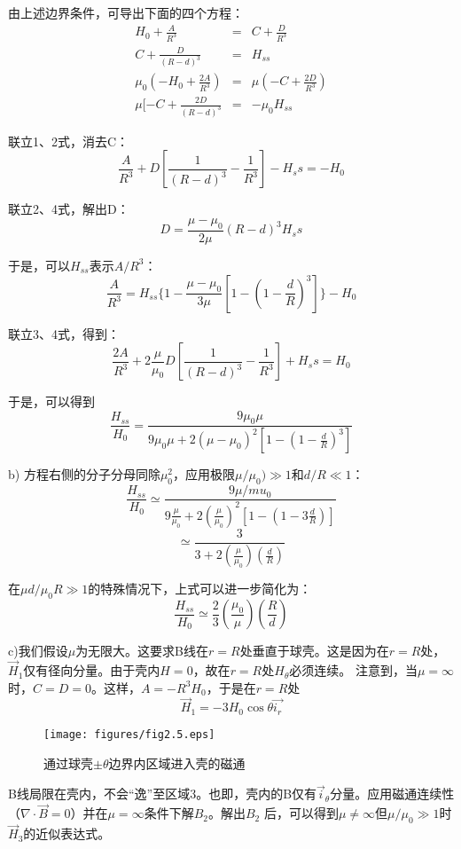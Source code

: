 由上述边界条件，可导出下面的四个方程：
\begin{eqnarray*}
  H_0+\frac{A}{R^3}&=& C+\frac{D}{R^3} \\
  C+\frac{D}{(R-d)^3}&=& H_{ss}\\
  \mu_0(-H_0+\frac{2A}{R^3})&=& \mu(-C+\frac{2D}{R^3})\\
  \mu[-C+\frac{2D}{(R-d)^3}&=& -\mu_0 H_{ss}
\end{eqnarray*}

联立1、2式，消去C：
$$
\frac{A}{R^3}+D[\frac{1}{(R-d)^3}-\frac{1}{R^3}]-H_ss =-H_0
$$

联立2、4式，解出D：
$$
D=\frac{\mu-\mu_0}{2\mu} (R-d)^3 H_ss
$$

于是，可以$H_{ss}$表示$A/R^3$：
$$
\frac{A}{R^3}=H_{ss}\{1-\frac{\mu-\mu_0}{3\mu}[1-(1-\frac{d}{R})^3]\}-H_0
$$

联立3、4式，得到：
$$
\frac{2A}{R^3}+2\frac{\mu}{\mu_0}D[\frac{1}{(R-d)^3}-\frac{1}{R^3}]+H_ss =H_0
$$

于是，可以得到
\begin{equation*}
\frac{H_{ss}}{H_0}=\frac{9\mu_0 \mu}{9\mu_0 \mu+2(\mu-\mu_0)^2\left[1-\left(1-\frac{d}{R}\right)^3\right]}
\end{equation*}

b) 方程右侧的分子分母同除$\mu_0^2$，应用极限$\mu/\mu_0)\gg 1$和$d/R\ll 1$：
$$\frac{H_{ss}}{H_0}\simeq \frac{9\mu/mu_0}{9\frac{\mu}{\mu_0}+2(\frac{\mu}{\mu_0})^2[1-(1-3\frac{d}{R})]}$$
$$\simeq\frac{3}{3+2(\frac{\mu}{\mu_0})(\frac{d}{R})}$$

在$\mu d/\mu_0 R \gg 1$的特殊情况下，上式可以进一步简化为：
$$\frac{H_{ss}}{H_0}\simeq \frac{2}{3}(\frac{\mu_0}{\mu})(\frac{R}{d})$$

c)我们假设$\mu$为无限大。这要求B线在$r=R$处垂直于球壳。这是因为在$r=R$处，$\vec{H}_1$仅有径向分量。由于壳内$H=0$，故在$r=R$处$H_\theta$必须连续。
注意到，当$\mu=\infty$时，$C=D=0$。这样，$A=-R^3 H_0$，于是在$r=R$处
$$\vec{H}_1=-3 H_0 \cos\theta \vec{i_r}$$

\begin{figure}
	\centering
	\texttt{[image: figures/fig2.5.eps]}
	\caption{通过球壳$\pm \theta$边界内区域进入壳的磁通}
\end{figure}

B线局限在壳内，不会“逸”至区域3。也即，壳内的B仅有$\vec{i}_\theta$分量。应用磁通连续性（$\nabla \cdot \vec{B}=0$）并在$\mu=\infty$条件下解$B_2$。解出$B_2$
后，可以得到$\mu \neq \infty$但$\mu/\mu_0 \gg 1$时$\vec{H}_3$的近似表达式。

